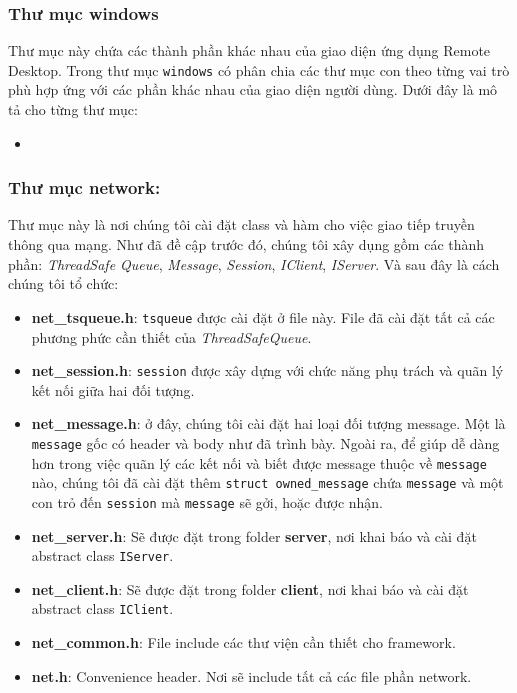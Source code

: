 \subsubsection{Thư mục windows}
Thư mục này chứa các thành phần khác nhau của giao diện ứng dụng Remote Desktop. Trong thư mục \verb|windows| có phân chia các thư mục con theo từng vai trò phù hợp ứng với các phần khác nhau của giao diện người dùng. Dưới đây là mô tả cho từng thư mục:
\begin{itemize}
	\item 
\end{itemize}	


\subsubsection{Thư mục network: }
Thư mục này là nơi chúng tôi cài đặt class và hàm cho việc giao tiếp truyền thông qua mạng. Như đã đề cập trước đó, chúng tôi xây dụng gồm các thành phần: \textit{ThreadSafe Queue}, \textit{Message}, \textit{Session}, \textit{IClient}, \textit{IServer}. Và sau đây là cách chúng tôi tổ chức: 
\begin{itemize}
	\item \textbf{net\_tsqueue.h}: \verb|tsqueue| được cài đặt ở file này. File đã cài đặt tất cả các phương phức cần thiết của \textit{ThreadSafeQueue}.
	 \item \textbf{net\_session.h}: \verb|session| được xây dựng với chức năng phụ trách và quãn lý kết nối giữa hai đối tượng.
	 \item \textbf{net\_message.h}: ở đây, chúng tôi cài đặt hai loại đối tượng message. Một là \verb|message| gốc có header và body như đã trình bày. Ngoài ra, để giúp dễ dàng hơn trong việc quãn lý các kết nối và biết được message thuộc về \verb|message| nào, chúng tôi đã cài đặt thêm \verb|struct owned_message| chứa \verb|message| và một con trỏ đến \verb|session| mà \verb|message| sẽ gởi, hoặc được nhận. 
	 \item \textbf{net\_server.h}: Sẽ được đặt trong folder \textbf{server}, nơi khai báo và cài đặt abstract class \verb|IServer|.
	 \item \textbf{net\_client.h}: Sẽ được đặt trong folder \textbf{client}, nơi khai báo và cài đặt abstract class \verb|IClient|. 
	 \item \textbf{net\_common.h}: File include các thư viện cần thiết cho framework.
	 \item \textbf{net.h}: Convenience header. Nơi sẽ include tất cả các file phần network. 
\end{itemize}
